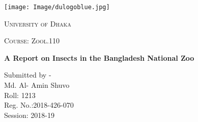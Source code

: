 \documentclass[12pt,a4paper]{report}
\begin{document}
\begin{titlepage}
\centering
\texttt{[image: Image/dulogoblue.jpg]}\\
{\scshape\LARGE University of Dhaka \par}
\vspace{1cm}
{\scshape\Large Course: Zool.110\par}
\vspace{1.5cm}
{\huge\bfseries A Report on Insects in the Bangladesh National Zoo\par}
\vspace{2cm}
{}
\vfill
Submitted by - \\
\vspace{0.5cm}
Md. Al- Amin Shuvo\\ Roll: 1213\\Reg. No.:2018-426-070\\Session: 2018-19
\vfill
\SetDate[01/12/2019]
{\large \today\par}
\end{titlepage}
\end{document}
